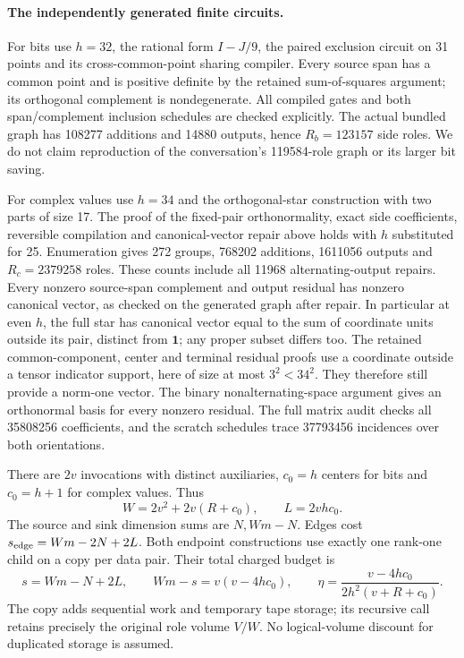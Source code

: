 \paragraph{The independently generated finite circuits.}
For bits use $h=32$, the rational form $I-J/9$, the paired exclusion circuit
on 31 points and its cross-common-point sharing compiler. Every source span
has a common point and is positive definite by the retained sum-of-squares
argument; its orthogonal complement is nondegenerate. All compiled gates
and both span/complement inclusion schedules are checked explicitly.
The actual bundled graph has 108277 additions and 14880 outputs, hence
$R_b=123157$ side roles. We do not claim reproduction of the conversation's
119584-role graph or its larger bit saving.

For complex values use $h=34$ and the orthogonal-star construction with two
parts of size 17. The proof of the fixed-pair orthonormality, exact side
coefficients, reversible compilation and canonical-vector repair above
holds with $h$ substituted for 25. Enumeration gives 272 groups, 768202
additions, 1611056 outputs and $R_c=2379258$ roles. These counts include all
11968 alternating-output repairs. Every nonzero source-span complement and
output residual has nonzero canonical vector, as checked on the generated
graph after repair. In particular at even $h$, the full star has canonical
vector equal to the sum of coordinate units outside its pair, distinct from
$\mathbf1$; any proper subset differs too. The retained common-component,
center and terminal residual proofs use a coordinate outside a tensor
indicator support, here of size at most $3^2<34^2$. They therefore still
provide a norm-one vector. The binary nonalternating-space argument gives
an orthonormal basis for every nonzero residual. The full matrix audit
checks all 35808256 coefficients, and the scratch schedules trace 37793456
incidences over both orientations.

There are $2v$ invocations with distinct auxiliaries, $c_0=h$ centers for
bits and $c_0=h+1$ for complex values. Thus
\[
 W=2v^2+2v(R+c_0),\qquad L=2vhc_0.
\]
The source and sink dimension sums are $N,Wm-N$. Edges cost
$s_{\rm edge}=Wm-2N+2L$. Both endpoint constructions use exactly one
rank-one child on a copy per data pair. Their total charged budget is
\[
 s=Wm-N+2L,\qquad Wm-s=v(v-4hc_0),\qquad
 \eta=\frac{v-4hc_0}{2h^2(v+R+c_0)}.
\]
The copy adds sequential work and temporary tape storage; its recursive
call retains precisely the original role volume $V/W$. No logical-volume
discount for duplicated storage is assumed.

